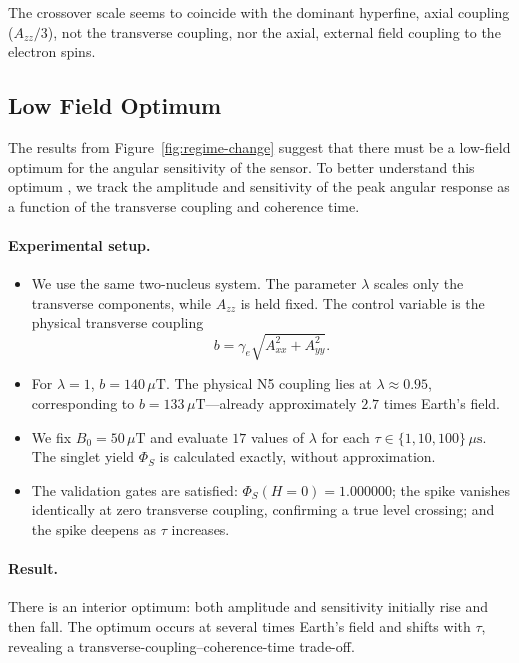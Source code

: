 \documentclass[12pt]{article}
\begin{document}
The crossover scale seems to coincide with the dominant hyperfine, axial coupling ($A_{zz}/3$), not the transverse coupling, nor the axial, external field coupling to the electron spins.
\subsection{Low Field Optimum}
The results from Figure~\ref{fig:regime-change} suggest that there must be a low-field optimum for the angular sensitivity of the sensor. To better understand this optimum , we track the amplitude and sensitivity of the peak angular response as a function of the transverse coupling and coherence time.

\paragraph{Experimental setup.}
\begin{itemize}
    \item We use the same two-nucleus system. The parameter $\lambda$ scales only the transverse components, while $A_{zz}$ is held fixed. The control variable is the physical transverse coupling
    \begin{equation}
        b = \gamma_e \sqrt{A_{xx}^{2} + A_{yy}^{2}}.
    \end{equation}
    \item For $\lambda = 1$, $b = 140\,\mu\mathrm{T}$. The physical N5 coupling lies at $\lambda \approx 0.95$, corresponding to $b = 133\,\mu\mathrm{T}$---already approximately $2.7$ times Earth's field.
    \item We fix $B_0 = 50\,\mu\mathrm{T}$ and evaluate $17$ values of $\lambda$ for each $\tau \in \{1, 10, 100\}\,\mu\mathrm{s}$. The singlet yield $\Phi_S$ is calculated exactly, without approximation.
    \item The validation gates are satisfied: $\Phi_S(H = 0) = 1.000000$; the spike vanishes identically at zero transverse coupling, confirming a true level crossing; and the spike deepens as $\tau$ increases.
\end{itemize}

\paragraph{Result.}
There is an interior optimum: both amplitude and sensitivity initially rise and then fall. The optimum occurs at several times Earth's field and shifts with $\tau$, revealing a transverse-coupling--coherence-time trade-off.
\end{document}
